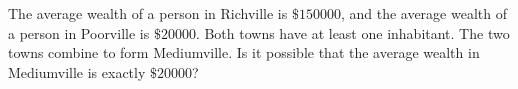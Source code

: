 The average wealth of a person in Richville is $\$150000$, and the average wealth of a person in Poorville is $\$20000$. Both towns have at least one inhabitant. The two towns combine to form Mediumville. Is it possible that the average wealth in Mediumville is exactly $\$20000$?
